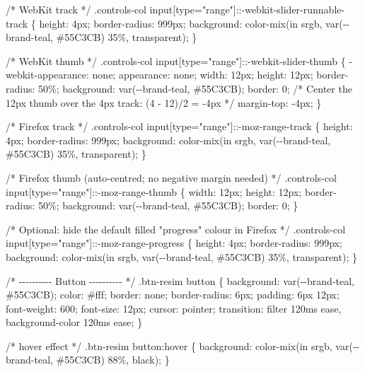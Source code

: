 \documentclass[
  letterpaper,
  DIV=11,
  numbers=noendperiod]{scrreprt}
\newenvironment{Shaded}{\begin{snugshade}}{\end{snugshade}}
\newcommand{\NormalTok}[1]{\textcolor[rgb]{0.00,0.23,0.31}{#1}}
\theoremstyle{definition}
\theoremstyle{plain}
\theoremstyle{definition}
\theoremstyle{remark}
\begin{document}
\begin{Shaded}
\begin{Highlighting}[]
\NormalTok{/* WebKit track */}
\NormalTok{.controls{-}col input[type="range"]::{-}webkit{-}slider{-}runnable{-}track \{}
\NormalTok{  height: 4px;}
\NormalTok{  border{-}radius: 999px;}
\NormalTok{  background: color{-}mix(in srgb, var({-}{-}brand{-}teal, \#55C3CB) 35\%, transparent);}
\NormalTok{\}}

\NormalTok{/* WebKit thumb */}
\NormalTok{.controls{-}col input[type="range"]::{-}webkit{-}slider{-}thumb \{}
\NormalTok{  {-}webkit{-}appearance: none;}
\NormalTok{  appearance: none;}
\NormalTok{  width: 12px; height: 12px; border{-}radius: 50\%;}
\NormalTok{  background: var({-}{-}brand{-}teal, \#55C3CB);}
\NormalTok{  border: 0;}
\NormalTok{  /* Center the 12px thumb over the 4px track: (4 {-} 12)/2 = {-}4px */}
\NormalTok{  margin{-}top: {-}4px;}
\NormalTok{\}}

\NormalTok{/* Firefox track */}
\NormalTok{.controls{-}col input[type="range"]::{-}moz{-}range{-}track \{}
\NormalTok{  height: 4px;}
\NormalTok{  border{-}radius: 999px;}
\NormalTok{  background: color{-}mix(in srgb, var({-}{-}brand{-}teal, \#55C3CB) 35\%, transparent);}
\NormalTok{\}}

\NormalTok{/* Firefox thumb (auto{-}centred; no negative margin needed) */}
\NormalTok{.controls{-}col input[type="range"]::{-}moz{-}range{-}thumb \{}
\NormalTok{  width: 12px; height: 12px; border{-}radius: 50\%;}
\NormalTok{  background: var({-}{-}brand{-}teal, \#55C3CB);}
\NormalTok{  border: 0;}
\NormalTok{\}}

\NormalTok{/* Optional: hide the default filled "progress" colour in Firefox */}
\NormalTok{.controls{-}col input[type="range"]::{-}moz{-}range{-}progress \{}
\NormalTok{  height: 4px; border{-}radius: 999px;}
\NormalTok{  background: color{-}mix(in srgb, var({-}{-}brand{-}teal, \#55C3CB) 35\%, transparent);}
\NormalTok{\}}


\NormalTok{/* {-}{-}{-}{-}{-}{-}{-}{-}{-}{-} Button {-}{-}{-}{-}{-}{-}{-}{-}{-}{-} */}
\NormalTok{.btn{-}resim button \{}
\NormalTok{  background: var({-}{-}brand{-}teal, \#55C3CB);}
\NormalTok{  color: \#fff;}
\NormalTok{  border: none;}
\NormalTok{  border{-}radius: 6px;}
\NormalTok{  padding: 6px 12px;}
\NormalTok{  font{-}weight: 600;}
\NormalTok{  font{-}size: 12px;}
\NormalTok{  cursor: pointer;}
\NormalTok{  transition: filter 120ms ease, background{-}color 120ms ease;}
\NormalTok{\}}

\NormalTok{/* hover effect */}
\NormalTok{.btn{-}resim button:hover \{}
\NormalTok{  background: color{-}mix(in srgb, var({-}{-}brand{-}teal, \#55C3CB) 88\%, black);}
\NormalTok{\}}


\end{Highlighting}
\end{Shaded}
\end{document}

